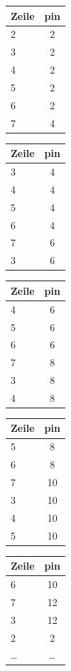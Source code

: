 \documentclass[ngerman, 11pt]{scrreprt}
\begin{document}
	\begin{multicols}{5}
		\begin{tabular}{l | c}
			\textbf{Zeile} & \textbf{pin} \\ \hline
			2 & 2 \\ \hline
			3 & 2 \\ \hline
			4 & 2 \\ \hline
			5 & 2 \\ \hline
			6 & 2 \\ \hline
			7 & 4 \\ \hline
		\end{tabular}
		\begin{tabular}{l|c}
			\textbf{Zeile} & \textbf{pin} \\ \hline
			3 & 4 \\ \hline
			4 & 4 \\ \hline
			5 & 4 \\ \hline
			6 & 4 \\ \hline
			7 & 6 \\ \hline
			3 & 6 \\ \hline
		\end{tabular}
		\begin{tabular}{l|c}
			\textbf{Zeile} & \textbf{pin} \\ \hline
			4 & 6 \\ \hline
			5 & 6 \\ \hline
			6 & 6 \\ \hline
			7 & 8 \\ \hline
			3 & 8 \\ \hline
			4 & 8 \\ \hline
		\end{tabular}
		\begin{tabular}{l|c}
			\textbf{Zeile} & \textbf{pin} \\ \hline
			5 & 8 \\ \hline
			6 & 8 \\ \hline
			7 & 10 \\ \hline
			3 & 10 \\ \hline
			4 & 10 \\ \hline
			5 & 10 \\ \hline
		\end{tabular}
		\begin{tabular}{l|c}
			\textbf{Zeile} & \textbf{pin} \\ \hline
			6 & 10 \\ \hline
			7 & 12 \\ \hline
			3 & 12 \\ \hline
			2 & 2 \\ \hline
			\dots & \dots \\\hline
		\end{tabular}
	\end{multicols}
	
\end{document}
